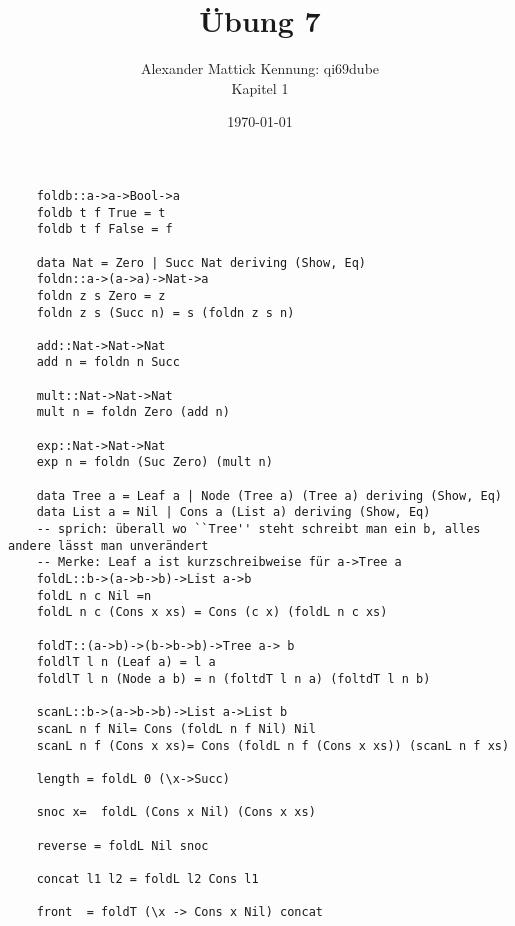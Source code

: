 \documentclass{article}
\author{
Alexander Mattick Kennung: qi69dube\\
Kapitel 1
}
\date{\today}
\title{Übung 7}
\begin{document}
	\maketitle
	\begin{verbatim}
	foldb::a->a->Bool->a
	foldb t f True = t
	foldb t f False = f

	data Nat = Zero | Succ Nat deriving (Show, Eq)
	foldn::a->(a->a)->Nat->a
	foldn z s Zero = z
	foldn z s (Succ n) = s (foldn z s n)

	add::Nat->Nat->Nat
	add n = foldn n Succ

	mult::Nat->Nat->Nat
	mult n = foldn Zero (add n)

	exp::Nat->Nat->Nat
	exp n = foldn (Suc Zero) (mult n)

	data Tree a = Leaf a | Node (Tree a) (Tree a) deriving (Show, Eq)
	data List a = Nil | Cons a (List a) deriving (Show, Eq)
	-- sprich: überall wo ``Tree'' steht schreibt man ein b, alles andere lässt man unverändert
	-- Merke: Leaf a ist kurzschreibweise für a->Tree a
	foldL::b->(a->b->b)->List a->b
	foldL n c Nil =n
	foldL n c (Cons x xs) = Cons (c x) (foldL n c xs)

	foldT::(a->b)->(b->b->b)->Tree a-> b
	foldlT l n (Leaf a) = l a
	foldlT l n (Node a b) = n (foltdT l n a) (foltdT l n b)

	scanL::b->(a->b->b)->List a->List b
	scanL n f Nil= Cons (foldL n f Nil) Nil
	scanL n f (Cons x xs)= Cons (foldL n f (Cons x xs)) (scanL n f xs)

	length = foldL 0 (\x->Succ)

	snoc x=  foldL (Cons x Nil) (Cons x xs)

	reverse = foldL Nil snoc

	concat l1 l2 = foldL l2 Cons l1

	front  = foldT (\x -> Cons x Nil) concat
	\end{verbatim}
\end{document}
